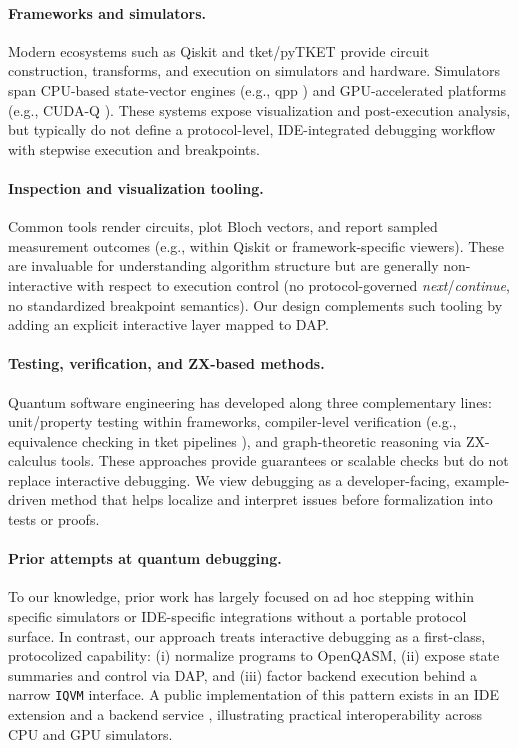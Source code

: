 \documentclass[12pt]{article}
\begin{document}
\begin{itemize}
\paragraph{Frameworks and simulators.}
Modern ecosystems such as Qiskit \cite{qiskit2024} and tket/pyTKET \cite{tket,pytket} provide circuit construction, transforms, and execution on simulators and hardware. Simulators span CPU-based state-vector engines (e.g., qpp \cite{qpp-github}) and GPU-accelerated platforms (e.g., CUDA-Q \cite{cudaq-github}). These systems expose visualization and post-execution analysis, but typically do not define a protocol-level, IDE-integrated debugging workflow with stepwise execution and breakpoints.

\paragraph{Inspection and visualization tooling.}
Common tools render circuits, plot Bloch vectors, and report sampled measurement outcomes (e.g., within Qiskit or framework-specific viewers). These are invaluable for understanding algorithm structure but are generally non-interactive with respect to execution control (no protocol-governed \emph{next}/\emph{continue}, no standardized breakpoint semantics). Our design complements such tooling by adding an explicit interactive layer mapped to DAP.

\paragraph{Testing, verification, and ZX-based methods.}
Quantum software engineering has developed along three complementary lines: unit/property testing within frameworks, compiler-level verification (e.g., equivalence checking in tket pipelines \cite{tket}), and graph-theoretic reasoning via ZX-calculus tools. These approaches provide guarantees or scalable checks but do not replace interactive debugging. We view debugging as a developer-facing, example-driven method that helps localize and interpret issues before formalization into tests or proofs.

\paragraph{Prior attempts at quantum debugging.}
To our knowledge, prior work has largely focused on ad hoc stepping within specific simulators or IDE-specific integrations without a portable protocol surface. In contrast, our approach treats interactive debugging as a first-class, protocolized capability: (i) normalize programs to OpenQASM, (ii) expose state summaries and control via DAP, and (iii) factor backend execution behind a narrow \texttt{IQVM} interface. A public implementation of this pattern exists in an IDE extension and a backend service \cite{qasm-adapter-vscode,qdb-qscore}, illustrating practical interoperability across CPU and GPU simulators.


\end{itemize}
\end{document}
